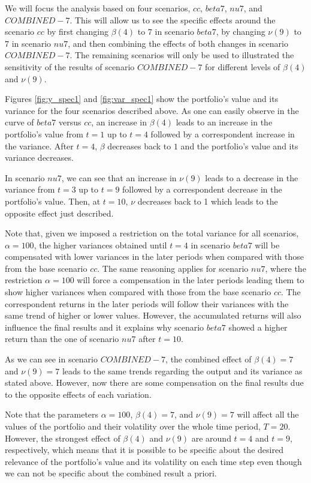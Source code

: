 We will focus the analysis based on four scenarios, $cc$, $beta7$, $nu7$, and $COMBINED-7$.
This will allow us to see the specific effects around the scenario $cc$ by first changing $\beta(4)$ to $7$ in scenario $beta7$, by changing $\nu(9)$ to $7$ in scenario $nu7$, and then combining the effects of both changes in scenario $COMBINED-7$.
The remaining scenarios will only be used to illustrated the sensitivity of the results of scenario $COMBINED-7$ for different levels of $\beta(4)$  and $\nu(9)$.

Figures \ref{fig:y_spec1} and \ref{fig:var_spec1} show the portfolio's value and its variance for the four scenarios described above.
As one can easily observe in the curve of $beta7$ versus $cc$, an increase in $\beta(4)$ leads to an increase in the portfolio's value from $t=1$ up to $t=4$ followed by a correspondent increase in the variance.
After $t=4$, $\beta$ decreases back to $1$ and the portfolio's value and its variance decreases.

In scenario $nu7$, we can see that an increase in $\nu(9)$ leads to a decrease in the variance from $t=3$ up to $t=9$ followed by a correspondent decrease in the portfolio's value.
%
Then, at $t=10$, $\nu$ decreases back to 1 which leads to the opposite effect just described.


Note that, given we imposed a restriction on the total variance for all scenarios, $\alpha=100$, the higher variances obtained until $t=4$ in scenario $beta7$ will be compensated with lower variances in the later periods when compared with those from the base scenario $cc$.
%
The same reasoning applies for scenario $nu7$, where the restriction $\alpha=100$ will force a compensation in the later periods leading them to show higher variances when compared with those from the base scenario $cc$.
%
The correspondent returns in the later periods will follow their variances with the same trend of higher or lower values. 
%
However, the accumulated returns will also influence the final results and it explains why scenario $beta7$ showed a higher return than the one of scenario $nu7$ after $t=10$.

As we can see in scenario $COMBINED-7$, the combined effect of $\beta(4)=7$ and $\nu(9)=7$ leads to the same trends regarding the output and its variance as stated above.
However, now there are some compensation on the final results due to the opposite effects of each variation.
 
Note that the parameters $\alpha=100$, $\beta(4)=7$, and $\nu(9)=7$ will affect all the values of the portfolio and their volatility over the whole time period, $T=20$.
However, the strongest effect of $\beta(4)$ and $\nu(9)$ are around $t=4$ and $t=9$, respectively, which means that it is possible to be specific about the desired relevance of the portfolio's value and its volatility on each time step even though we can not be specific about the combined result a priori.

